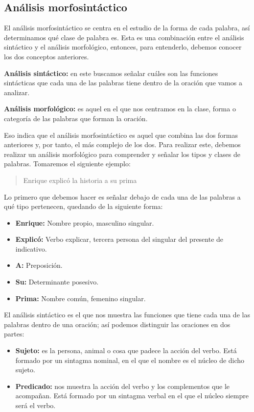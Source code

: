 \subsection{Análisis morfosintáctico}

El análisis morfosintáctico se centra en el estudio de la forma de cada palabra, así determinamos qué clase de palabra es. Esta es una combinación entre el análisis sintáctico y el análisis morfológico, entonces, para entenderlo, debemos conocer los dos conceptos anteriores.

\textbf{Análisis sintáctico:} en este buscamos señalar cuáles son las funciones sintácticas que cada una de las palabras tiene dentro de la oración que vamos a analizar.

\textbf{Análisis morfológico:} es aquel en el que nos centramos en la clase, forma o categoría de las palabras que forman la oración.

Eso indica que el análisis morfosintáctico es aquel que combina las dos formas anteriores y, por tanto, el más complejo de los dos. Para realizar este, debemos realizar un análisis morfológico para comprender y señalar los tipos y clases de palabras. Tomaremos el siguiente ejemplo:

\begin{quote}
Enrique explicó la historia a su prima
\end{quote}

Lo primero que debemos hacer es señalar debajo de cada una de las palabras a qué tipo pertenecen, quedando de la siguiente forma:
\begin{itemize}
\item \textbf{Enrique:} Nombre propio, masculino singular.
\item \textbf{Explicó:} Verbo explicar, tercera persona del singular del presente de indicativo.
\item \textbf{A:} Preposición.
\item \textbf{Su:} Determinante posesivo.
\item \textbf{Prima:} Nombre común, femenino singular.
\end{itemize}

El análisis sintáctico es el que nos muestra las funciones que tiene cada una de las palabras dentro de una oración; así podemos distinguir las oraciones en dos partes:
\begin{itemize}
\item \textbf{Sujeto:} es la persona, animal o cosa que padece la acción del verbo. Está formado por un sintagma nominal, en el que el nombre es el núcleo de dicho sujeto.
\item \textbf{Predicado:} nos muestra la acción del verbo y los complementos que le acompañan. Está formado por un sintagma verbal en el que el núcleo siempre será el verbo.
\end{itemize}

